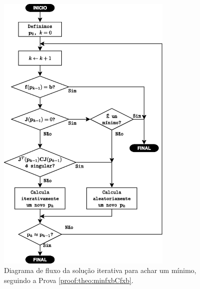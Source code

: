 \begin{figure}[!h]
     \centering
         \includegraphics[width=0.75\textwidth]{chapters/minimization-fx/fluxo1.eps}
        \caption{Diagrama de fluxo da solução iterativa para achar um mínimo, seguindo a Prova \ref{proof:theo:minfxbCfxb}.}
        \label{fig:fluxo1}
\end{figure}


